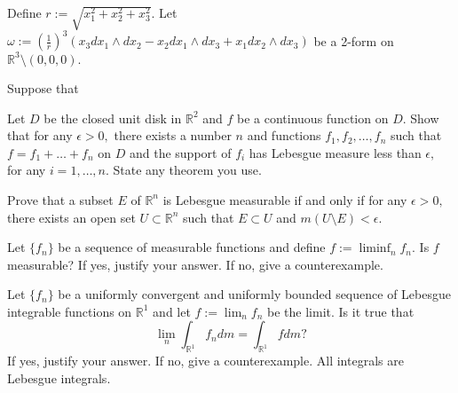 \documentclass[11pt, addpoints]{exam}
\begin{document}
\begin{questions}

\question[20]
Define $r := \sqrt{x_1^2+x_2^2+x_3^2}$. Let $\omega := (\frac{1}{r})^3 (x_3 dx_1 \wedge dx_2 - x_2 dx_1 \wedge dx_3 + x_1 dx_2 \wedge dx_3)$ be a 2-form on $\mathbb R^3\setminus (0,0,0).$

\newpage

\question[15] Suppose that 

\newpage

\question[20]
Let $D$ be the closed unit disk in $\mathbb R^2$ and $f$ be a continuous function on $D.$ Show that for any $\epsilon >0,$ there exists a number $n$ and functions $f_1, f_2, \ldots, f_n$ such that $f=f_1+\ldots+f_n$ on $D$ and the support of $f_i$ has Lebesgue measure less than $\epsilon,$ for any $i =1, \ldots, n.$ State any theorem you use.
\newpage





\question[20] 

Prove that a subset $E$ of $\mathbb R^n$ is Lebesgue measurable if and only if for any $\epsilon >0,$ there exists an open set $U\subset \mathbb R^n$ such that $E\subset U$ and $m(U\setminus E)<\epsilon.$


\newpage

\question[20]
Let $\{f_n\}$ be a sequence of measurable functions and define $f:=\liminf_n f_n.$ Is $f$ measurable? If yes, justify your answer. If no, give a counterexample.

\newpage


\question[15]

 Let $\{f_n\}$ be a uniformly convergent and uniformly bounded sequence of Lebesgue integrable functions on $\mathbb R^1$ and let $f:=\lim_n f_n$ be the limit. Is it true that $$\lim_n \int_{\mathbb R^1} f_n dm = \int_{\mathbb R^1} f dm ?$$ If yes, justify your answer. If no, give a counterexample. All integrals are Lebesgue integrals.




\end{questions}
\end{document}
